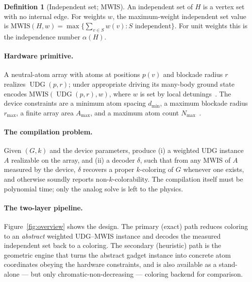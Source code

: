 \documentclass[11pt]{article}
\theoremstyle{definition}
\newtheorem{definition}[theorem]{Definition}
\theoremstyle{remark}
\newcommand{\UDG}{\operatorname{UDG}}
\newcommand{\MWIS}{\mathrm{MWIS}}
\newcommand{\indep}{\alpha}
\begin{document}
\begin{definition}[Independent set; MWIS]
An independent set of $H$ is a vertex set with no internal edge. For weights $w$, the
maximum-weight independent set value is
$\MWIS(H,w)=\max\{\sum_{v\in S}w(v):S\text{ independent}\}$. For unit weights this is
the independence number $\indep(H)$.
\end{definition}

\paragraph{Hardware primitive.} A neutral-atom array with atoms at positions $p(v)$
and blockade radius $r$ realizes $\UDG(p,r)$; under appropriate driving its many-body
ground state encodes $\MWIS(\UDG(p,r),w)$, where $w$ is set by local
detunings~\cite{Pichler2018,Ebadi2022}. The device constraints are a minimum atom
spacing $d_{\min}$, a maximum blockade radius $r_{\max}$, a finite array area
$A_{\max}$, and a maximum atom count $N_{\max}$~\cite{Wurtz2023}.

\paragraph{The compilation problem.} Given $(G,k)$ and the device parameters, produce
(i) a weighted UDG instance $A$ realizable on the array, and (ii) a decoder $\delta$,
such that from any MWIS of $A$ measured by the device, $\delta$ recovers a proper
$k$-coloring of $G$ whenever one exists, and otherwise soundly reports
non-$k$-colorability. The compilation itself must be polynomial time; only the analog
solve is left to the physics.

\paragraph{The two-layer pipeline.} Figure~\ref{fig:overview} shows the design. The
primary (exact) path reduces coloring to an \emph{abstract} weighted UDG--MWIS
instance and decodes the measured independent set back to a coloring. The secondary
(heuristic) path is the geometric engine that turns the abstract gadget instance into
concrete atom coordinates obeying the hardware constraints, and is also available as a
stand-alone --- but only chromatic-non-decreasing --- coloring backend for comparison.
\end{document}

